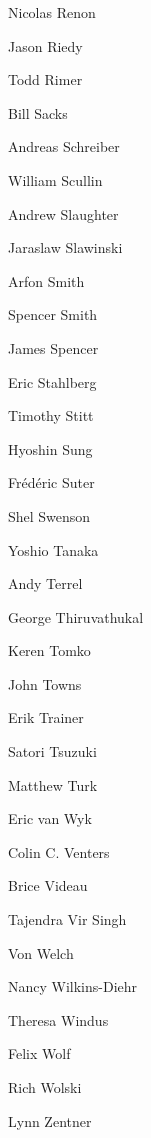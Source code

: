 \documentclass[11pt, oneside]{amsart}
\begin{document}
\begin{multicols}{3}
Nicolas Renon

Jason Riedy

Todd Rimer

Bill Sacks

Andreas Schreiber

William Scullin

Andrew Slaughter

Jaraslaw Slawinski

Arfon Smith

Spencer Smith

James Spencer

Eric Stahlberg

Timothy Stitt

Hyoshin Sung

Fr\'{e}d\'{e}ric Suter

Shel Swenson

Yoshio Tanaka

Andy Terrel

George  Thiruvathukal

Keren Tomko

John Towns

Erik Trainer

Satori Tsuzuki

Matthew Turk

Eric van Wyk

Colin C. Venters

Brice Videau

Tajendra Vir Singh

Von Welch

Nancy Wilkins-Diehr

Theresa Windus

Felix Wolf

Rich Wolski

Lynn Zentner

\end{multicols}





\end{document}
